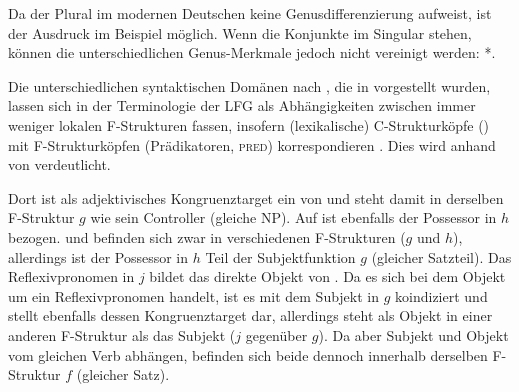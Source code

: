 Da der Plural im modernen Deutschen keine
Genusdifferenzierung aufweist, ist der Ausdruck im Beispiel möglich. Wenn die
Konjunkte im Singular stehen, können die unterschiedlichen Genus-Merkmale
jedoch nicht vereinigt werden: *.

Die unterschiedlichen syntaktischen Domänen nach \citet[54]{corbett2006}, die
in  vorgestellt wurden, lassen sich in der Terminologie
der LFG als Abhängigkeiten zwischen immer weniger lokalen F-Strukturen fassen,
insofern (lexikalische) C-Strukturköpfe () mit F-Strukturköpfen
(Prädikatoren, \textsc{pred}) korrespondieren \autocite[117]{bresnanetal2016}.
Dies wird anhand von  verdeutlicht.

Dort ist  als adjektivisches Kongruenztarget
ein  von  und steht damit in derselben F-Struktur $g$
wie sein Controller (gleiche NP). Auf  ist ebenfalls der Possessor
 in $h$ bezogen.  und  befinden sich zwar in
verschiedenen F-Strukturen ($g$ und $h$), allerdings ist der Possessor in $h$
Teil der Subjektfunktion $g$ (gleicher Satzteil). Das Reflexivpronomen
 in $j$ bildet das direkte Objekt von . Da es sich bei dem
Objekt um ein Reflexivpronomen handelt, ist es mit dem Subjekt in $g$
koindiziert und stellt ebenfalls dessen Kongruenztarget dar, allerdings steht
 als Objekt in einer anderen F-Struktur als das Subjekt ($j$ gegenüber
$g$). Da aber Subjekt und Objekt vom gleichen Verb  abhängen,
befinden sich beide dennoch innerhalb derselben F-Struktur $f$ (gleicher Satz).

